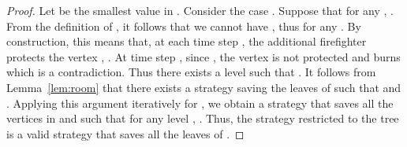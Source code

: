 \documentclass[10pt]{article}
\begin{document}
\begin{proof}
Let  be the  smallest value in .
Consider the case . Suppose that for any ,
. From the definition of , it follows that we cannot
have , thus  for any . By
construction, this means that, at each time step , the
additional firefighter protects the vertex , .
At time step , since , the vertex
 is not protected and burns which is a contradiction. Thus
there exists a level  such that .
It follows from Lemma~\ref{lem:room} that there exists a strategy saving the leaves of 
such that  and . Applying this argument
iteratively for , we obtain a strategy  that saves all the
vertices in  and such that for any level , . Thus, the strategy  restricted to the tree
 is a valid strategy that saves all the leaves of .
\end{proof}


\begin{figure}[!h]


\end{figure}
\end{document}
